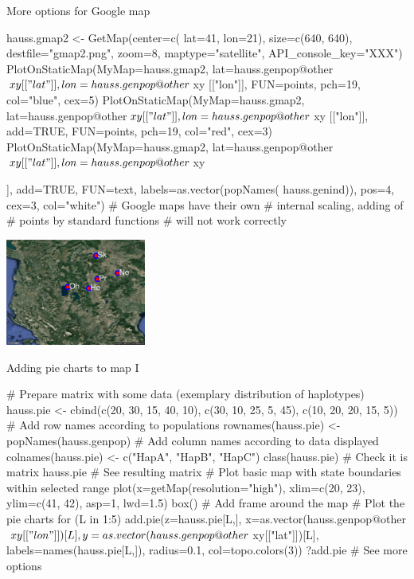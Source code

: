 \documentclass[compress, ucs, xelatex, 11pt, xcolor=svgnames,
	hyperref={
		bookmarks=true,
		unicode=true,
		colorlinks=true,
		pdftitle={Molecular data in R},
		plainpages=false,
		pdfauthor={Vojtech Zeisek},
		pdfsubject={Course about phylogeny and evolution in R},
		pdfcreator={XeLaTeX},
		pdfkeywords={R, evolution, phylogeny, molecular data},
		linkcolor=Tomato,
		anchorcolor=SaddleBrown,
		citecolor=Goldenrod,
		filecolor=DarkMagenta,
		menucolor=Sienna,
		urlcolor=DarkTurquoise,
		pdftex},
	url={hyphens, lowtilde} %
	]{beamer}
\begin{document}
\begin{frame}[fragile]{More options for Google map}
	\begin{multicols}{2}
		\begin{spluscode}
    hauss.gmap2 <- GetMap(center=c(
      lat=41, lon=21), size=c(640,
      640), destfile="gmap2.png",
      zoom=8, maptype="satellite",
      API_console_key="XXX")
    PlotOnStaticMap(MyMap=hauss.gmap2,
      lat=hauss.genpop@other$xy[["lat"
      ]], lon=hauss.genpop@other$xy
      [["lon"]], FUN=points, pch=19,
      col="blue", cex=5)
    PlotOnStaticMap(MyMap=hauss.gmap2,
      lat=hauss.genpop@other$xy[["lat"
      ]], lon=hauss.genpop@other$xy
      [["lon"]], add=TRUE, FUN=points,
      pch=19, col="red", cex=3)
    PlotOnStaticMap(MyMap=hauss.gmap2,
      lat=hauss.genpop@other$xy[["lat"
      ]], lon=hauss.genpop@other$xy
		\end{spluscode}
		\begin{spluscode}
      [["lon"]], add=TRUE, FUN=text,
      labels=as.vector(popNames(
      hauss.genind)), pos=4, cex=3,
      col="white")
    # Google maps have their own
    # internal scaling, adding of
    # points by standard functions
    # will not work correctly
		\end{spluscode}
		\begin{center}
			\includegraphics[height=3.5cm]{gmap2.jpg}
		\end{center}
	\end{multicols}
\end{frame}

\begin{frame}[fragile]{Adding pie charts to map I}
	\begin{spluscode}
    # Prepare matrix with some data (exemplary distribution of haplotypes)
    hauss.pie <- cbind(c(20, 30, 15, 40, 10), c(30, 10, 25, 5, 45),
      c(10, 20, 20, 15, 5))
    # Add row names according to populations
    rownames(hauss.pie) <- popNames(hauss.genpop)
    # Add column names according to data displayed
    colnames(hauss.pie) <- c("HapA", "HapB", "HapC")
    class(hauss.pie) # Check it is matrix
    hauss.pie # See resulting matrix
    # Plot basic map with state boundaries within selected range
    plot(x=getMap(resolution="high"), xlim=c(20, 23), ylim=c(41, 42),
      asp=1, lwd=1.5)
    box() # Add frame around the map
    # Plot the pie charts
    for (L in 1:5) { add.pie(z=hauss.pie[L,], x=as.vector(hauss.genpop@other
      $xy[["lon"]])[L], y=as.vector(hauss.genpop@other$xy[["lat"]])[L],
      labels=names(hauss.pie[L,]), radius=0.1, col=topo.colors(3)) }
    ?add.pie # See more options
	\end{spluscode}
\end{frame}
\end{document}
